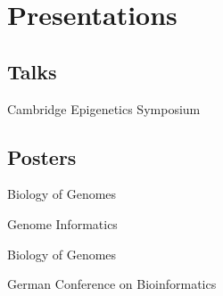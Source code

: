 \documentclass{klmr-cv}
\begin{document}
\section{Presentations}

\subsection{Talks}

\date{2014}
\item{Cambridge Epigenetics Symposium}

\subsection{Posters}

\date{2015}
\item{Biology of Genomes}
\date{2014}
\item{Genome Informatics}
\date{2013}
\item{Biology of Genomes}
\date{2009}
\item{German Conference on Bioinformatics}
\end{document}
